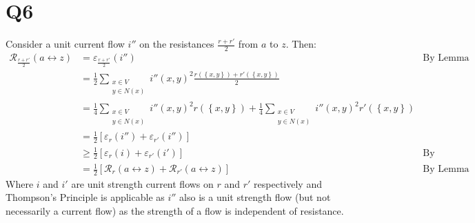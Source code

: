 \documentclass[a4paper, 11pt]{article}
\def\set#1{\left\{ #1 \right\}}
\begin{document}
\section*{Q6}


Consider a unit current flow $i''$ on the resistances $\frac{r+r'}2$ from $a$ to $z$. Then:
\begin{align*}
	\mathcal{R}_{\frac{r+r'}2}(a\leftrightarrow z)
	 & = \varepsilon_{\frac{r+r'}2}(i'') &\text{By Lemma 3.29} \\
	 & = \frac 12 \sum_{\substack{x\in V\\ y\in N(x)}} i''(x,y)^2 \frac{r(\set{x,y})+r'(\set{x,y})}{2} \\
	 & = \frac 14 \sum_{\substack{x\in V\\ y\in N(x)}} i''(x,y)^2 r(\set{x,y})
	   + \frac 14 \sum_{\substack{x\in V\\ y\in N(x)}} i''(x,y)^2 r'(\set{x,y})\\
	 & = \frac12 \left[ \varepsilon_{r}(i'') + \varepsilon_{r'}(i'') \right]\\
	 & \geq \frac12 \left[ \varepsilon_{r}(i) + \varepsilon_{r'}(i') \right] &\text{By Thompson's Principle}\\
	 & = \frac12 \left[ 
	   \mathcal{R}_{r}(a\leftrightarrow z) 
	 + \mathcal{R}_{r'}(a\leftrightarrow z) 
	 \right]&\text{By Lemma 3.29}
\end{align*}
Where $i$ and $i'$ are unit strength current flows on $r$ and $r'$ respectively and Thompson's Principle is applicable as $i''$ also is a unit strength flow (but not necessarily a current flow) as the strength of a flow is independent of resistance. 
\end{document}
